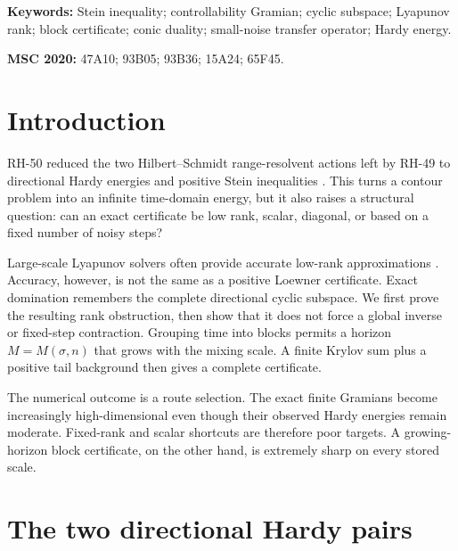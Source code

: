 \documentclass[11pt]{article}
\theoremstyle{definition}
\theoremstyle{remark}
\begin{document}
\noindent\textbf{Keywords:} Stein inequality; controllability Gramian;
cyclic subspace; Lyapunov rank; block certificate; conic duality;
small-noise transfer operator; Hardy energy.

\medskip
\noindent\textbf{MSC 2020:} 47A10; 93B05; 93B36; 15A24; 65F45.

\section{Introduction}

RH-50 reduced the two Hilbert--Schmidt range-resolvent actions left by
RH-49 to directional Hardy energies and positive Stein inequalities
\citep{WangDirectional2026,WangHardy2026}.  This turns a contour problem
into an infinite time-domain energy, but it also raises a structural
question: can an exact certificate be low rank, scalar, diagonal, or based
on a fixed number of noisy steps?

Large-scale Lyapunov solvers often provide accurate low-rank approximations
\citep{Antoulas2005,BennerLiPenzl2008,Simoncini2016}.  Accuracy, however,
is not the same as a positive Loewner certificate.  Exact domination
remembers the complete directional cyclic subspace.  We first prove the
resulting rank obstruction, then show that it does not force a global
inverse or fixed-step contraction.  Grouping time into blocks permits a
horizon \(M=M(\sigma,n)\) that grows with the mixing scale.  A finite
Krylov sum plus a positive tail background then gives a complete
certificate.

The numerical outcome is a route selection.  The exact finite Gramians
become increasingly high-dimensional even though their observed Hardy
energies remain moderate.  Fixed-rank and scalar shortcuts are therefore
poor targets.  A growing-horizon block certificate, on the other hand, is
extremely sharp on every stored scale.

\section{The two directional Hardy pairs}
\end{document}
